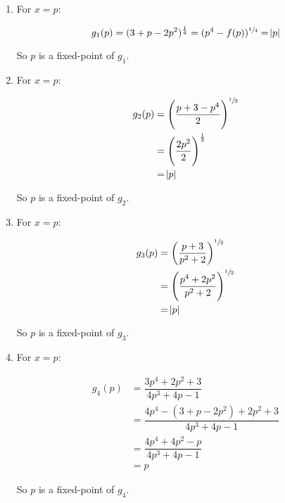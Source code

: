 \documentclass[../../../../Assignments]{subfiles}
\begin{document}
\begin{solution}
    \begin{enumerate}[label = \alph*)]
        \item For \(x = p\):

            \[g_1(p) = (3 + p - 2p^2)^{\frac{1}{4}} = (p^4 - f(p))^{\sfrac{1}{4}} = \abs{p}\]

            So \(p\) is a fixed-point of \(g_1\).

        \item For \(x = p\):

            \begin{align*}
                g_2(p) &= \left(\dfrac{p + 3 - p^4}{2}\right)^{\sfrac{1}{2}} \\
                       &= \left(\dfrac{2p^2}{2}\right)^{\frac{1}{2}} \\
                       &= \abs{p}
            \end{align*}

            So \(p\) is a fixed-point of \(g_2\).

        \item For \(x = p\):

            \begin{align*}
                g_3(p) &= \left(\dfrac{p + 3}{p^2 + 2}\right)^{\sfrac{1}{2}} \\
                       &= \left(\dfrac{p^4 + 2p^2}{p^2 + 2}\right)^{\sfrac{1}{2}} \\
                       &= \abs{p}
            \end{align*}

            So \(p\) is a fixed-point of \(g_3\).

        \item For \(x = p\):

            \begin{align*}
                g_4(p) &= \dfrac{3p^4 + 2p^2 + 3}{4p^3 + 4p - 1} \\
                       &= \dfrac{4p^4 - (3 + p - 2p^2) + 2p^2 + 3}{4p^3 + 4p - 1} \\
                       &= \dfrac{4p^4 + 4p^2 -p}{4p^3 + 4p - 1} \\
                       &= p
            \end{align*}

            So \(p\) is a fixed-point of \(g_4\).
    \end{enumerate}
\end{solution}
\end{document}
